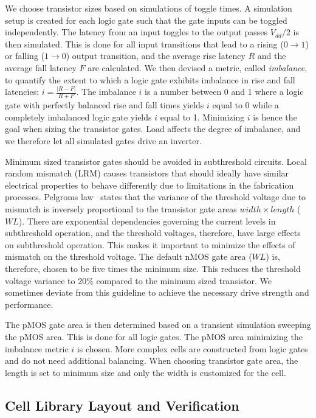 We choose transistor sizes based on simulations of toggle times.  A simulation setup is created for each logic gate such that the gate inputs can be toggled independently.
The latency from an input toggles to the output passes $V_{dd}/2$ is then simulated.  This is done for all input transitions that lead to a rising ($0 \rightarrow 1$) or falling ($1 \rightarrow 0$) output transition, and the average rise latency $R$ and the average fall latency $F$ are calculated.
We then devised a metric, called \emph{imbalance}, to quantify the extent to which a logic gate exhibits imbalance in rise and fall latencies: %
$i = \frac{\lvert R - F \rvert}{R + F}$.
The imbalance $i$ is a number between 0 and 1 where a logic gate with perfectly balanced rise and fall times yields $i$ equal to 0 while a completely imbalanced logic gate yields $i$ equal to 1. Minimizing $i$ is hence the goal when sizing the transistor gates. 
Load affects the degree of imbalance, and we therefore let all simulated gates drive an inverter.

Minimum sized transistor gates should be avoided in subthreshold circuits.
Local random mismatch (LRM) causes transistors that should ideally have similar electrical properties to behave differently due to limitations in the fabrication processes.
Pelgroms law~\cite{pelgrom} states that the variance of the threshold voltage due to mismatch is inversely proportional to the transistor gate areas $width \times length$ ($WL$).
There are exponential dependencies governing the current levels in subthreshold operation, and the threshold voltages, therefore, have large effects on subthreshold operation.  This makes it important to minimize the effects of mismatch on the threshold voltage.  
The default nMOS gate area ($WL$) is, therefore, chosen to be five times the minimum size.  This reduces the threshold voltage variance to 20\% compared to the minimum sized transistor.  We sometimes deviate from this guideline to achieve the necessary drive strength and performance.  

The pMOS gate area is then determined based on a transient simulation sweeping the pMOS area.  This is done for all logic gates. The pMOS area minimizing the imbalance metric $i$ is chosen.  More complex cells are constructed from logic gates and do not need additional balancing. 
When choosing transistor gate area, the length is set to minimum size and only the width is customized for the cell. 

\subsection{Cell Library Layout and Verification}
\label{sec:cell_lib_verification}

